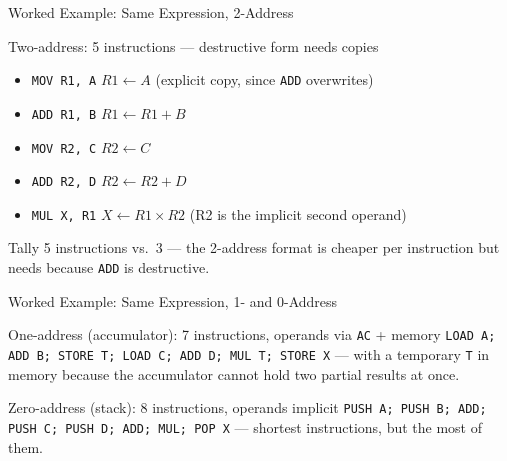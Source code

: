 \documentclass[aspectratio=169]{beamer}
\begin{document}
\begin{frame}{Worked Example: Same Expression, 2-Address}
  \footnotesize
  \begin{block}{Two-address: 5 instructions --- destructive form needs copies}
    \begin{itemize}
      \item \texttt{MOV R1, A} \quad $R1 \gets A$ \hspace{0.5cm}(explicit copy, since \texttt{ADD} overwrites)
      \item \texttt{ADD R1, B} \quad $R1 \gets R1 + B$
      \item \texttt{MOV R2, C} \quad $R2 \gets C$
      \item \texttt{ADD R2, D} \quad $R2 \gets R2 + D$
      \item \texttt{MUL X, R1} \quad $X \gets R1 \times R2$ \hspace{0.3cm}(R2 is the implicit second operand)
    \end{itemize}
  \end{block}
  \begin{exampleblock}{Tally}
    5 instructions vs.\ 3 --- the 2-address format is cheaper per instruction
    but needs  because \texttt{ADD} is destructive.
  \end{exampleblock}
\end{frame}

\begin{frame}{Worked Example: Same Expression, 1- and 0-Address}
  \footnotesize
  \begin{block}{One-address (accumulator): 7 instructions, operands via \texttt{AC} + memory}
    \texttt{LOAD A; ADD B; STORE T; LOAD C; ADD D; MUL T; STORE X} --- with a
    temporary \texttt{T} in memory because the accumulator cannot hold two
    partial results at once.
  \end{block}
  \begin{block}{Zero-address (stack): 8 instructions, operands implicit}
    \texttt{PUSH A; PUSH B; ADD; PUSH C; PUSH D; ADD; MUL; POP X} --- shortest
    instructions, but the most of them.
  \end{block}
  \vspace{0.2cm}
\end{frame}
\end{document}
